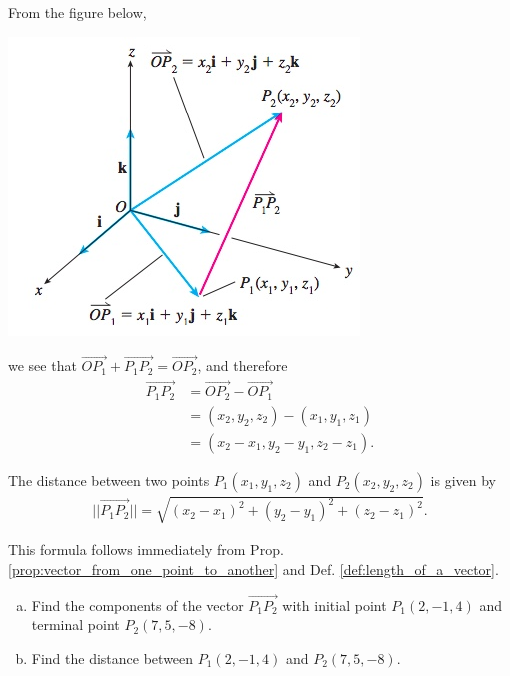 \documentclass[12pt,letterpaper,reqno]{article}
\numberwithin{equation}{section}
\begin{document}
\begin{pf}
From the figure below, 
\begin{center}
	\includegraphics[scale=0.5]{figures_mvc/P1P2}
\end{center}

we see that $\overrightarrow{OP_1}+\overrightarrow{P_1P_2}=\overrightarrow{OP_2}$, and therefore
\begin{align*}
	\overrightarrow{P_1P_2}&=\overrightarrow{OP_2}-\overrightarrow{OP_1} \\
	&=(x_2,y_2,z_2)-(x_1,y_1,z_1) \\
	&=(x_2-x_1,y_2-y_1,z_2-z_1).
\end{align*}	
\end{pf}

\begin{cor}
	The distance between two points $P_1(x_1,y_1,z_2)$ and $P_2(x_2,y_2,z_2)$ is given by
	\begin{align*}
		||\overrightarrow{P_1P_2}||=\sqrt{(x_2-x_1)^2+(y_2-y_1)^2+(z_2-z_1)^2}.
	\end{align*}
\end{cor}

\begin{pf}
	This formula follows immediately from Prop. \ref{prop:vector_from_one_point_to_another} and Def. \ref{def:length_of_a_vector}.
\end{pf}

\begin{exercise}
\begin{enumerate}[(a)]
	\item Find the components of the vector $\overrightarrow{P_1P_2}$ with initial point $P_1(2,-1,4)$ and terminal point $P_2(7,5,-8)$.
	\item Find the distance between $P_1(2,-1,4)$ and $P_2(7,5,-8)$.
\end{enumerate}	
\end{exercise}
\end{document}
